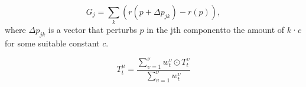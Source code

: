 \documentclass[12pt]{spieman}
\begin{document}
\begin{spacing}{2}
\begin{equation}
    G_{j} = \sum\limits_{k} (r(p+\Delta p_{jk})-r(p)),
    \label{eq5}
\end{equation}
where $\Delta p_{jk}$ is a vector that perturbs $p$ in the jth componentto the amount of $k$·$c$ for some suitable constant $c$.


\begin{equation}
    T^{\mu}_{t} = \frac{\sum\limits_{\upsilon=1}^{\nu} w^{\upsilon}_{t} \odot T^{\upsilon}_{t}}{\sum\limits_{\upsilon=1}^{\nu} w^{\upsilon}_{t}}
\end{equation}


\end{spacing}
\end{document}
